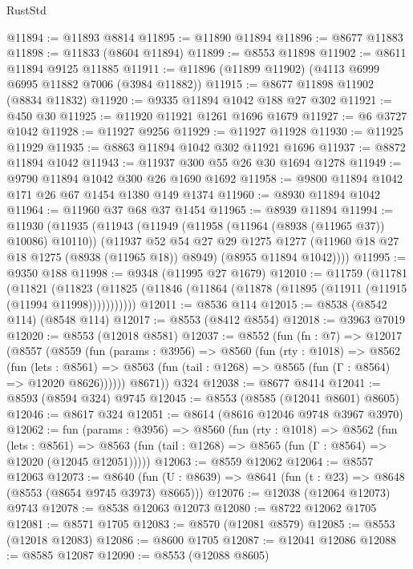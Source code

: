 \begin{lexlean}{RustStd}
\begin{coremodule}
@11894 := @11893 @8814
@11895 := @11890 @11894
@11896 := @8677 @11883
@11898 := @11833 (@8604 @11894)
@11899 := @8553 @11898
@11902 := @8611 @11894 @9125 @11885
@11911 := @11896 (@11899 @11902) (@4113 @6999 @6995 @11882 @7006 (@3984 @11882))
@11915 := @8677 @11898 @11902 (@8834 @11832)
@11920 := @9335 @11894 @1042 @188 @27 @302
@11921 := @450 @30
@11925 := @11920 @11921 @1261 @1696 @1679
@11927 := @6 @3727 @1042
@11928 := @11927 @9256
@11929 := @11927 @11928
@11930 := @11925 @11929
@11935 := @8863 @11894 @1042 @302 @11921 @1696
@11937 := @8872 @11894 @1042
@11943 := @11937 @300 @55 @26 @30 @1694 @1278
@11949 := @9790 @11894 @1042 @300 @26 @1690 @1692
@11958 := @9800 @11894 @1042 @171 @26 @67 @1454 @1380 @149 @1374
@11960 := @8930 @11894 @1042
@11964 := @11960 @37 @68 @37 @1454
@11965 := @8939 @11894
@11994 := @11930
    (@11935
      (@11943
        (@11949 (@11958 (@11964 (@8938 (@11965 @37)) @10086) @10110))
        (@11937
          @52
          @54
          @27
          @29
          @1275
          @1277
          (@11960 @18 @27 @18 @1275 (@8938 (@11965 @18)) @8949)
          (@8955 @11894 @1042))))
@11995 := @9350 @188
@11998 := @9348 (@11995 @27 @1679)
@12010 := @11759
    (@11781
      (@11821
        (@11823 (@11825 (@11846 (@11864 (@11878 (@11895 (@11911 (@11915 (@11994 @11998)))))))))))
@12011 := @8536 @114
@12015 := @8538 (@8542 @114) (@8548 @114)
@12017 := @8553 (@8412 @8554)
@12018 := @3963 @7019
@12020 := @8553 (@12018 @8581)
@12037 := @8552
    (fun (fn : @7) =>
    @12017
      (@8557
        (@8559
          (fun (params : @3956) =>
          @8560
            (fun (rty : @1018) =>
            @8562
              (fun (lets : @8561) =>
              @8563 (fun (tail : @1268) => @8565 (fun (Γ : @8564) => @12020 @8626))))))
        @8671))
    @324
@12038 := @8677 @8414
@12041 := @8593 (@8594 @324) @9745
@12045 := @8553 (@8585 (@12041 @8601) @8605)
@12046 := @8617 @324
@12051 := @8614 (@8616 @12046 @9748 @3967 @3970)
@12062 := fun (params : @3956) =>
  @8560
    (fun (rty : @1018) =>
    @8562
      (fun (lets : @8561) =>
      @8563 (fun (tail : @1268) => @8565 (fun (Γ : @8564) => @12020 (@12045 @12051)))))
@12063 := @8559 @12062
@12064 := @8557 @12063
@12073 := @8640
    (fun (U : @8639) => @8641 (fun (t : @23) => @8648 (@8553 (@8654 @9745 @3973) @8665)))
@12076 := @12038 (@12064 @12073) @9743
@12078 := @8538 @12063 @12073
@12080 := @8722 @12062 @1705
@12081 := @8571 @1705
@12083 := @8570 (@12081 @8579)
@12085 := @8553 (@12018 @12083)
@12086 := @8600 @1705
@12087 := @12041 @12086
@12088 := @8585 @12087
@12090 := @8553 (@12088 @8605)

\end{coremodule}
\end{lexlean}
